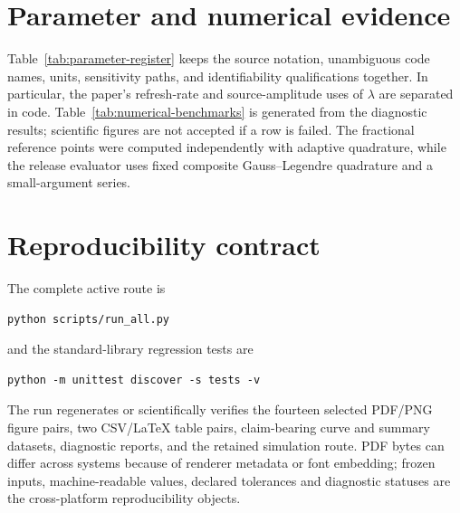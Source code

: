 \documentclass[11pt]{article}
\begin{document}


\clearpage


\clearpage


\clearpage
\begin{landscape}

\end{landscape}

\begin{landscape}

\end{landscape}

\section{Parameter and numerical evidence}

Table~\ref{tab:parameter-register} keeps the source notation, unambiguous code names, units, sensitivity paths, and identifiability qualifications together. In particular, the paper's refresh-rate and source-amplitude uses of \(\lambda\) are separated in code. Table~\ref{tab:numerical-benchmarks} is generated from the diagnostic results; scientific figures are not accepted if a row is failed. The fractional reference points were computed independently with adaptive quadrature, while the release evaluator uses fixed composite Gauss--Legendre quadrature and a small-argument series.

\section{Reproducibility contract}

The complete active route is
\begin{verbatim}
python scripts/run_all.py
\end{verbatim}
and the standard-library regression tests are
\begin{verbatim}
python -m unittest discover -s tests -v
\end{verbatim}
The run regenerates or scientifically verifies the fourteen selected PDF/PNG figure pairs, two CSV/LaTeX table pairs, claim-bearing curve and summary datasets, diagnostic reports, and the retained simulation route. PDF bytes can differ across systems because of renderer metadata or font embedding; frozen inputs, machine-readable values, declared tolerances and diagnostic statuses are the cross-platform reproducibility objects.
\end{document}
